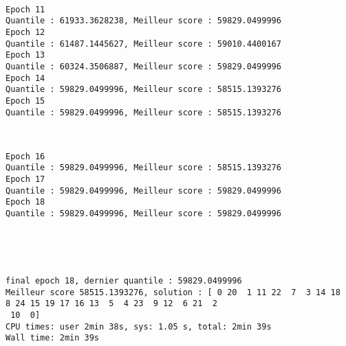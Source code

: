 \documentclass[11pt]{article}
\begin{document}
    \begin{center}
    \end{center}
    { \hspace*{\fill} \\}
    
    \begin{Verbatim}[commandchars=\\\{\}]
Epoch 11
Quantile : 61933.3628238, Meilleur score : 59829.0499996
Epoch 12
Quantile : 61487.1445627, Meilleur score : 59010.4400167
Epoch 13
Quantile : 60324.3506887, Meilleur score : 59829.0499996
Epoch 14
Quantile : 59829.0499996, Meilleur score : 58515.1393276
Epoch 15
Quantile : 59829.0499996, Meilleur score : 58515.1393276

    \end{Verbatim}

    \begin{center}
    \end{center}
    { \hspace*{\fill} \\}
    
    \begin{Verbatim}[commandchars=\\\{\}]
Epoch 16
Quantile : 59829.0499996, Meilleur score : 58515.1393276
Epoch 17
Quantile : 59829.0499996, Meilleur score : 59829.0499996
Epoch 18
Quantile : 59829.0499996, Meilleur score : 59829.0499996

    \end{Verbatim}

    \begin{center}
    \end{center}
    { \hspace*{\fill} \\}
    
    \begin{center}
    \end{center}
    { \hspace*{\fill} \\}
    
    \begin{Verbatim}[commandchars=\\\{\}]
final epoch 18, dernier quantile : 59829.0499996
Meilleur score 58515.1393276, solution : [ 0 20  1 11 22  7  3 14 18  8 24 15 19 17 16 13  5  4 23  9 12  6 21  2
 10  0]
CPU times: user 2min 38s, sys: 1.05 s, total: 2min 39s
Wall time: 2min 39s

    \end{Verbatim}
\end{document}
